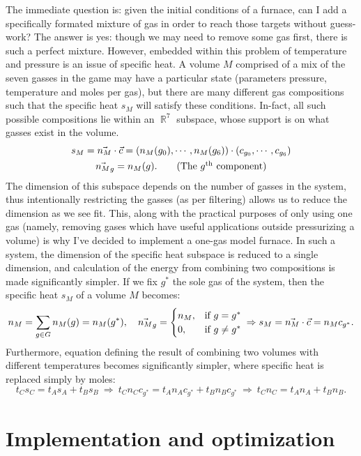 \documentclass{article}
\DeclareMathOperator{\R}{\mathbb{R}}
\begin{document}
The immediate question is: given the initial conditions of a furnace,
can I add a specifically formated mixture of gas in order to reach those
targets without guess-work? The answer is yes: though we may need to remove
some gas first, there is such a perfect mixture.
However, embedded within this problem of temperature and pressure is
an issue of specific heat. A volume $M$ comprised of a mix of the seven
gasses in the game may have a particular state (parameters pressure, temperature
and moles per gas), but there are many different gas compositions such that
the specific heat $s_M$ will satisfy these conditions.
In-fact, all such possible compositions lie within an $\R^7$ subspace, whose
support is on what gasses exist in the volume.
\begin{gather*}
    s_M
    = \vec{n_M}\cdot\vec c
    = (n_M(g_0),\cdots,n_M(g_6))\cdot(c_{g_0},\cdots,c_{g_6}) \\
    \vec{n_M}_g = n_M(g). \tag{\text{The $g^{\textrm{th}}$ component}}
\end{gather*}
The dimension of this subspace depends on the number of gasses in the system,
thus intentionally restricting the gasses (as per filtering) allows us to reduce
the dimension as we see fit.
This, along with the practical purposes of only using one gas (namely, removing
gases which have useful applications outside pressurizing a volume)
is why I've decided to implement a one-gas model furnace.
In such a system, the dimension of the specific heat subspace is reduced to
a single dimension, and calculation of the energy from combining two
compositions is made significantly simpler.
If we fix $g^\ast$ the sole gas of the system, then
the specific heat $s_M$ of a volume $M$ becomes:
\[
    n_M = \sum_{g\in G}n_M(g) = n_M(g^\ast),\quad
    \vec{n_M}_g = \begin{cases}
        n_M, & \text{if }g=g^\ast \\
        0, &\text{if }g\ne g^\ast
    \end{cases}\\
    \Rightarrow
    s_M
    = \vec{n_M}\cdot\vec{c}
    = n_M c_{g^\ast}.
\]
Furthermore, equation defining the result of combining two volumes with
different temperatures becomes significantly simpler, where specific heat
is replaced simply by moles:
\[
    t_C s_C = t_A s_A+t_B s_B\
    \Rightarrow\
    t_C n_C c_{g^\ast} = t_A n_A c_{g^\ast}+t_B n_B c_{g^\ast}\
    \Rightarrow\
    t_C n_C = t_A n_A+t_B n_B.
\]

\section{Implementation and optimization}
\end{document}
